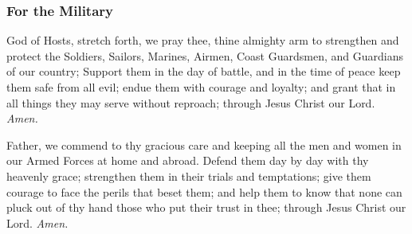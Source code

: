 

\subsubsection{For the Military}
 God of Hosts, stretch forth, we pray thee, thine almighty arm to strengthen and protect the Soldiers, Sailors, Marines, Airmen, Coast Guardsmen, and Guardians of our country; Support them in the day of battle, and in the time of peace keep them safe from all evil; endue them with courage and loyalty; and grant that in all things they may serve without reproach; through Jesus Christ our Lord. \textit{Amen.}

 Father, we commend to thy gracious care and keeping all the men and women in our Armed Forces at home and abroad. Defend them day by day with thy heavenly grace; strengthen them in their trials and temptations; give them courage to face the perils that beset them; and help them to know that none can pluck out of thy hand those who put their trust in thee; through Jesus Christ our Lord. \textit{Amen.}


